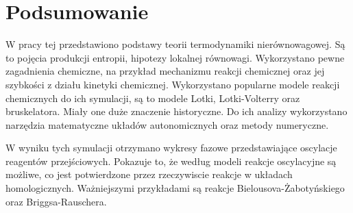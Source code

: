 \documentclass[10pt, a4paper, twoside, onecolumn]{article}
\numberwithin{equation}{section}
\begin{document}
	\section{Podsumowanie}
	W pracy tej przedstawiono podstawy teorii termodynamiki nierównowagowej. Są to pojęcia produkcji entropii, hipotezy lokalnej równowagi. Wykorzystano pewne zagadnienia chemiczne, na przykład mechanizmu reakcji chemicznej oraz jej szybkości z działu kinetyki chemicznej. Wykorzystano popularne modele reakcji chemicznych do ich symulacji, są to modele Lotki, Lotki-Volterry oraz bruskelatora. Miały one duże znaczenie historyczne. Do ich analizy wykorzystano narzędzia matematyczne układów autonomicznych oraz metody numeryczne. \par
	W wyniku tych symulacji otrzymano wykresy fazowe przedstawiające oscylacje reagentów przejściowych. Pokazuje to, że według modeli reakcje oscylacyjne są możliwe, co jest potwierdzone przez rzeczywiscie reakcje w układach homologicznych. Ważniejszymi przykładami są reakcje Bielousova-Żabotyńskiego oraz Briggsa-Rauschera.
	
	\pagebreak
	\printbibliography[title=Wykaz literatury]
	\pagebreak
	\listoffigures
	\pagebreak
	\listoftables
	\pagebreak
	
\end{document}
